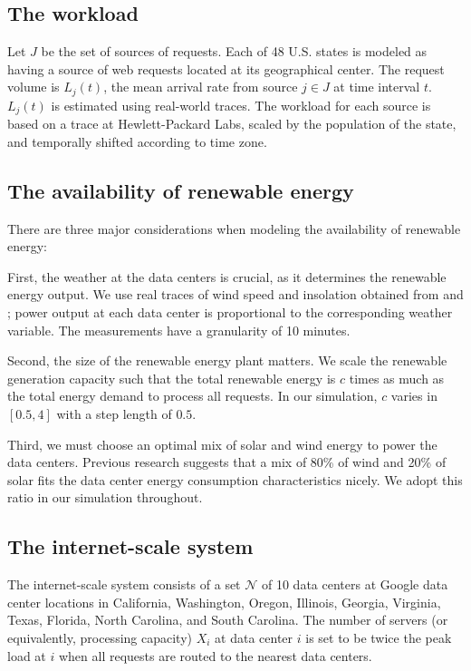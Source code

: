 \documentclass{acm_proc_article-sp}
\begin{document}
\subsection{The workload}
Let $J$ be the set of sources of requests. Each of 48 U.S. states is modeled as having a source of web requests located at its geographical center. The request volume is $L_j(t)$, the mean arrival rate from source $j \in J$ at time interval $t$. $L_j(t)$ is estimated using real-world traces. The workload for each source is based on a trace at Hewlett-Packard Labs, scaled by the population of the state, and temporally shifted according to time zone.

\subsection{The availability of renewable energy}
There are three major considerations when modeling the availability of renewable energy:

First, the weather at the data centers is crucial, as it determines the renewable energy output. We use real traces of wind speed and insolation obtained from \cite{renew1} and \cite{renew2}; power output at each data center is proportional to the corresponding weather variable. The measurements have a granularity of 10 minutes.

Second, the size of the renewable energy plant matters. We scale the renewable generation capacity such that the total renewable energy is $c$ times as much as the total energy demand to process all requests. In our simulation, $c$ varies in $[0.5, 4]$ with a step length of $0.5$.

Third, we must choose an optimal mix of solar and wind energy to power the data centers. Previous research \cite{adam:GLB} suggests that a mix of 80\% of wind and 20\% of solar fits the data center energy consumption characteristics nicely. We adopt this ratio in our simulation throughout.
\subsection{The internet-scale system}
The internet-scale system consists of a set $\mathcal{N}$ of 10 data centers at Google data center locations in California, Washington, Oregon, Illinois, Georgia, Virginia, Texas, Florida, North Carolina, and South Carolina. The number of servers (or equivalently, processing capacity) $X_i$ at data center $i$ is set to be twice the peak load at $i$ when all requests are routed to the nearest data centers.
\end{document}
